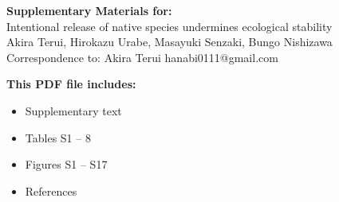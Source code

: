 \begin{center}
\LARGE{\textbf{Supplementary Materials for:}}\\[7.5mm]
\LARGE{Intentional release of native species undermines ecological stability}\\[7.5mm]
\large{Akira Terui, Hirokazu Urabe, Masayuki Senzaki, Bungo Nishizawa}\\[7.5mm]
\large{Correspondence to: Akira Terui hanabi0111@gmail.com}\\[15mm]\end{center}
\begin{flushleft}
\textbf{This PDF file includes:}
\begin{itemize}
\item Supplementary text
\item Tables S1 -- 8
\item Figures S1 -- S17
\item References
\end{itemize}
\end{flushleft}

\newpage